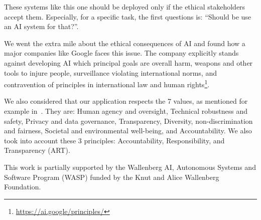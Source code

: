 \documentclass[12pt]{article}
\begin{document}
    These systems like this one should be deployed only if the ethical stakeholders accept them.
    Especially, for a specific task, the first questions is: ``Should be use an AI system for that?''.

    We went the extra mile about the ethical consequences of AI and found how a major companies like Google faces this issue.
    The company explicitly stands against developing AI which principal goals are overall harm, weapons and other tools to injure people, surveillance violating international norms, and contravention of principles in international law and human rights\footnote{\url{https://ai.google/principles/}}.

    We also considered that our application respects the 7 values, as mentioned for example in~\cite{easa:20210401.01}.
    They are: Human agency and oversight, Technical robustness and safety, Privacy and data governance, Transparency, Diversity, non-discrimination and fairness, Societal and environmental well-being, and Accountability.
    We also took into account these 3 principles: Accountability, Responsibility, and Transparency (ART)\cite{doi:10.1145/3278721.3278745}.

    \begin{ack}
        This work is partially supported by the Wallenberg AI, Autonomous Systems and Software Program (WASP) funded by the Knut and Alice Wallenberg Foundation.
    \end{ack}

    

    
\end{document}

